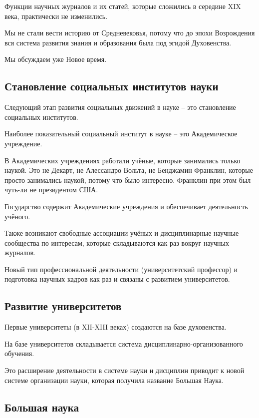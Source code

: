 \documentclass[main.tex]{subfiles}
\begin{document}
Функции научных журналов и их статей, которые сложились в середине XIX века, практически не изменились.

Мы не стали вести историю от Средневековья, потому что до эпохи Возрождения вся система развития знания и образования была под эгидой Духовенства.

Мы обсуждаем уже Новое время.

\subsection{Становление социальных институтов науки}


Следующий этап развития социальных движений в науке -- это становление социальных институтов.

Наиболее показательный социальный институт в науке -- это Академическое учреждение.

В Академических учреждениях работали учёные, которые занимались только наукой.
Это не Декарт, не Алессандро Вольта, не Бенджамин Франклин, которые просто занимались наукой, потому что было интересно.
Франклин при этом был чуть-ли не президентом США.

Государство содержит Академические учреждения и обеспечивает деятельность учёного.

Также возникают свободные ассоциации учёных и дисциплинарные научные сообщества по интересам, которые складываются как раз вокруг научных журналов.

Новый тип профессиональной деятельности (университетский профессор) и подготовка научных кадров как раз и связаны с развитием университетов.

\subsection{Развитие университетов}


Первые университеты (в XII-XIII веках) создаются на базе духовенства.

На базе университетов складывается система дисциплинарно-организованного обучения.

Это расширение деятельности в системе науки и дисциплин приводит к новой системе организации науки, которая получила название Большая Наука.

\subsection{Большая наука}
\end{document}

